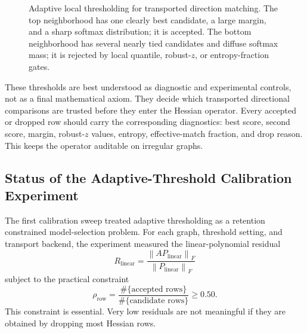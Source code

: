 \documentclass[11pt]{article}
\newcommand{\norm}[1]{\left\lVert #1 \right\rVert}
\begin{document}
\begin{figure}[ht]
\caption{Adaptive local thresholding for transported direction matching.  The
top neighborhood has one clearly best candidate, a large margin, and a sharp
softmax distribution; it is accepted.  The bottom neighborhood has several
nearly tied candidates and diffuse softmax mass; it is rejected by local
quantile, robust-\(z\), or entropy-fraction gates.}
\label{fig:adaptive-local-transport-thresholding}
\end{figure}

These thresholds are best understood as diagnostic and experimental controls,
not as a final mathematical axiom.  They decide which transported directional
comparisons are trusted before they enter the Hessian operator.  Every accepted
or dropped row should carry the corresponding diagnostics: best score, second
score, margin, robust-\(z\) values, entropy, effective-match fraction, and drop
reason.  This keeps the operator auditable on irregular graphs.

\subsection{Status of the Adaptive-Threshold Calibration Experiment}

The first calibration sweep treated adaptive thresholding as a retention
constrained model-selection problem.  For each graph, threshold setting, and
transport backend, the experiment measured the linear-polynomial residual
\[
  R_{\mathrm{linear}}
  =
  \frac{\norm{A P_{\mathrm{linear}}}_F}
       {\norm{P_{\mathrm{linear}}}_F}
\]
subject to the practical constraint
\[
  \rho_{\mathrm{row}}
  =
  \frac{\#\{\text{accepted rows}\}}
       {\#\{\text{candidate rows}\}}
  \ge 0.50.
\]
This constraint is essential.  Very low residuals are not meaningful if they
are obtained by dropping most Hessian rows.
\end{document}

